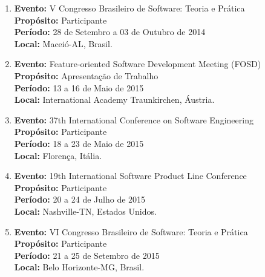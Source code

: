 \documentclass[a4paper,oneside,10pt]{article}
\begin{document}
\begin{enumerate}
\renewcommand{\labelenumi}{{\large\bfseries\arabic{enumi}.}}

\item   \textbf{Evento:} V Congresso Brasileiro de Software: Teoria e Prática \mbox{} \\
        \textbf{Propósito:} Participante\\
        \textbf{Período:} 28 de Setembro a 03 de Outubro de 2014\\
        \textbf{Local:} Maceió-AL, Brasil.

\item   \textbf{Evento:} Feature-oriented Software Development Meeting (FOSD) \mbox{} \\
        \textbf{Propósito:} Apresentação de Trabalho\\
        \textbf{Período:} 13 a 16 de Maio de 2015\\
        \textbf{Local:} International Academy Traunkirchen, Áustria.

\item   \textbf{Evento:} 37th International Conference on Software Engineering \mbox{} \\
        \textbf{Propósito:} Participante\\
        \textbf{Período:} 18 a 23 de Maio de 2015\\
        \textbf{Local:} Florença, Itália.

\item   \textbf{Evento:} 19th International Software Product Line Conference
 \mbox{} \\
        \textbf{Propósito:} Participante\\
        \textbf{Período:} 20 a 24 de Julho de 2015\\
        \textbf{Local:} Nashville-TN, Estados Unidos.

\item   \textbf{Evento:} VI Congresso Brasileiro de Software: Teoria e Prática \mbox{} \\
        \textbf{Propósito:} Participante\\
        \textbf{Período:} 21 a 25 de Setembro de 2015\\
        \textbf{Local:} Belo Horizonte-MG, Brasil.

\end{enumerate}
\end{document}
